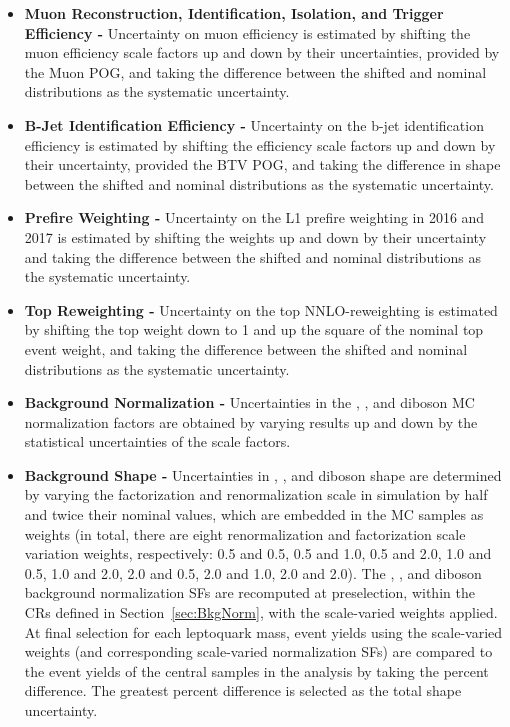 \begin{itemize}
\item \textbf{Muon Reconstruction, Identification, Isolation, and Trigger Efficiency - }
Uncertainty on muon efficiency is estimated by shifting the muon efficiency scale factors up and down by their uncertainties, provided by the Muon POG, and taking the difference between the shifted and nominal distributions as the systematic uncertainty.


\item \textbf{B-Jet Identification Efficiency - }
Uncertainty on the b-jet identification efficiency is estimated by shifting the efficiency scale factors up and down by their uncertainty, provided the BTV POG, and taking the difference in shape between the shifted and nominal distributions as the systematic uncertainty. 

\item \textbf{Prefire Weighting - }
Uncertainty on the L1 prefire weighting in 2016 and 2017 is estimated by shifting the weights up and down by their uncertainty and taking the difference between the shifted and nominal distributions as the systematic uncertainty.

\item \textbf{Top \pt Reweighting - }
Uncertainty on the top \pt NNLO-reweighting is estimated by shifting the top \pt weight down to 1 and up the square of the nominal top \pt event weight, and taking the difference between the shifted and nominal distributions as the systematic uncertainty.  

\item \textbf{Background Normalization - }
Uncertainties in the \ZJETS, \ttbar, and diboson MC normalization factors are obtained by varying results up and down by the statistical uncertainties of the scale factors.

\item \textbf{Background Shape - }
Uncertainties in \ZJETS, \ttbar, and diboson shape are determined by varying the factorization and renormalization scale in simulation by half and twice their nominal values, which are embedded in the MC samples as weights (in total, there are eight renormalization and factorization scale variation weights, respectively: 0.5 and 0.5, 0.5 and 1.0, 0.5 and 2.0, 1.0 and 0.5, 1.0 and 2.0, 2.0 and 0.5, 2.0 and 1.0, 2.0 and 2.0). The \ZJETS, \ttbar, and diboson background normalization SFs are recomputed at preselection, within the CRs defined in Section~\ref{sec:BkgNorm}, with the scale-varied weights applied. At final selection for each leptoquark mass, event yields using the scale-varied weights (and corresponding scale-varied normalization SFs) are compared to the event yields of the central samples in the analysis by taking the percent difference. The greatest percent difference is selected as the total shape uncertainty.


\end{itemize}
